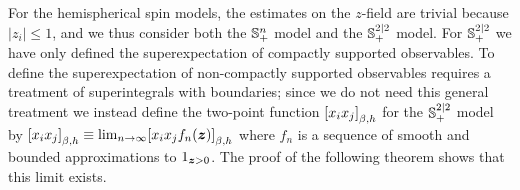 \documentclass[11pt,a4paper]{article}
\begin{document}
For the hemispherical spin models, the estimates on the $z$-field are trivial
because $|z_i|\leq 1$, and we thus consider both the ${\mathbb S}^{n}_{+}$ model and the ${\mathbb S}^{2|2}_{+}$ model.
For ${\mathbb S}^{2|2}_+$ we have only defined the
superexpectation of compactly supported observables. To define the
superexpectation of non-compactly supported observables requires a
treatment of superintegrals with boundaries; since we do not need this
general treatment we instead define the two-point function
$\cb{{x_{i} x_{j}}}_{\beta,h}$ for the ${\mathbb S}^{2|2}_{+}$ model by
$\cb{x_{i} x_{j}}_{\beta,h} \bydef \lim_{n\to\infty} \cb{x_{i} x_{j}
  f_{n}(\V{z})}_{\beta,h}$ where $f_{n}$ is a sequence of smooth and
bounded approximations to $1_{\boldsymbol{z}>0}$.  The proof of the following
theorem shows that this limit exists.
\end{document}
